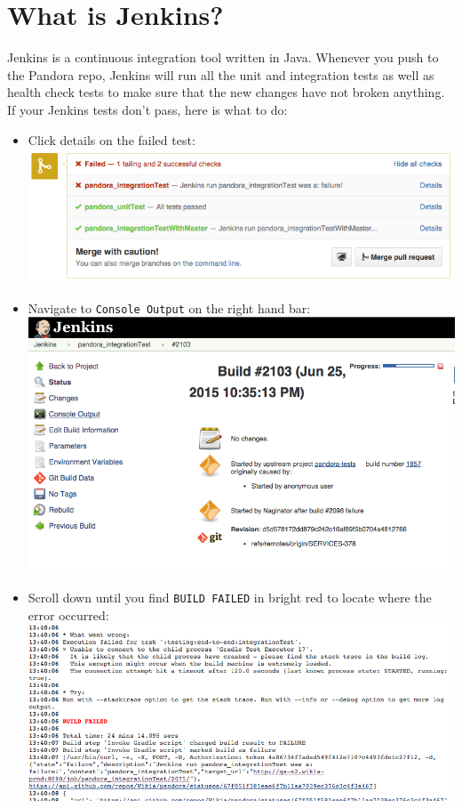 \documentclass[oneside]{book}
\begin{document}
\section{What is Jenkins?}
Jenkins is a continuous integration tool written in Java. Whenever you push to the Pandora repo, Jenkins will run all the unit and integration tests as well as health check tests to make sure that the new changes have not broken anything. If your Jenkins tests don't pass, here is what to do: \\
\begin{itemize}
	\item Click details on the failed test:\\
	\includegraphics[scale=0.4]{githubtestsfailed.png} 
	\item Navigate to \texttt{Console Output} on the right hand bar:\\
	\includegraphics[scale=0.4]{jenkinshome.png}
	\item Scroll down until you find \texttt{BUILD FAILED} in bright red to locate where the error occurred:\\			\includegraphics[scale=0.4]{jenkinsbuildfailed.png}
\end{itemize}
\end{document}
